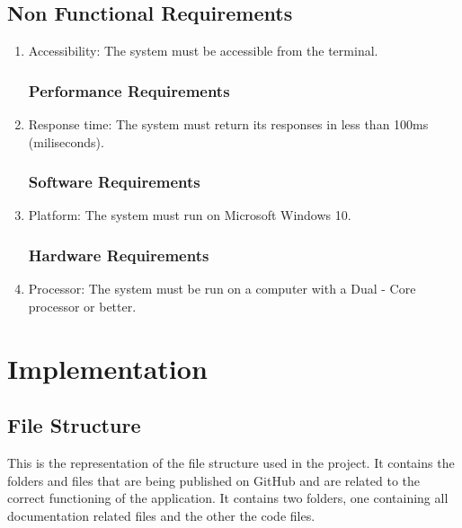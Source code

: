 \documentclass{report}
\begin{document}
\section{Non Functional Requirements}
\begin{enumerate}
\subsection{Usability Requirements}
\item{Accessibility: The system must be accessible from the terminal.}
\subsection{Performance Requirements}
\item{Response time: The system must return its responses in less than 100ms (miliseconds).}
\subsection{Software Requirements}
\item{Platform: The system must run on Microsoft Windows 10.}
\subsection{Hardware Requirements}
\item{Processor: The system must be run on a computer with a Dual - Core processor or better.}
\end{enumerate}

\chapter{Implementation}
\section{File Structure}
This is the representation of the file structure used in the project. It contains the folders and files that are being published on GitHub and are related to the correct functioning of the application. It contains two folders, one containing all documentation related files and the other the code files.
\end{document}
